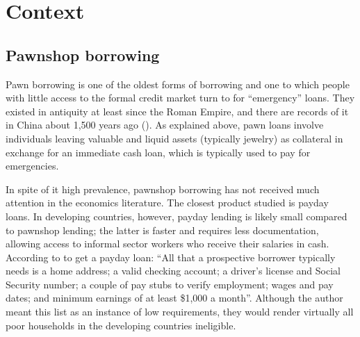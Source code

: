 \documentclass[oneside,11pt]{article}
\begin{document}


\section{Context} \label{context}

\subsection{Pawnshop borrowing}
    
Pawn borrowing is one of the oldest forms of borrowing and one to which people with little access to the formal credit market turn to for ``emergency'' loans. They existed in antiquity at least since the Roman Empire, and there are records of it in China about 1,500 years ago (\cite{PawnShops}). As explained above, pawn loans involve individuals leaving valuable and liquid assets (typically jewelry) as collateral in exchange for an immediate cash loan, which is typically used to pay for emergencies. 


In spite of it high prevalence, pawnshop borrowing has not received much attention in the economics literature. The closest product studied is payday loans. In developing countries, however, payday lending is likely small compared to pawnshop lending; the latter is faster and requires less documentation, allowing access to informal sector workers who receive their salaries in cash. According to \cite{Payday} to get a payday loan: ``All that a prospective borrower typically needs is a home address; a valid checking account; a driver’s license and Social Security number; a couple of pay stubs to verify employment; wages and pay dates; and minimum earnings of at least \$1,000 a month''. Although the author meant this list as an instance of low requirements, they would render virtually all poor households in the developing countries ineligible. 
\end{document}
